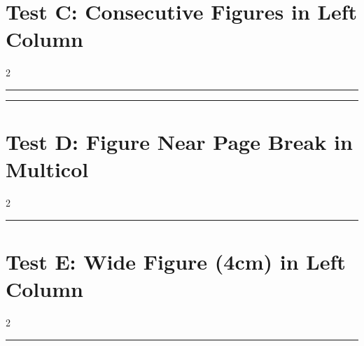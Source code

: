 \documentclass[a4paper,11pt]{article}
\begin{document}
\section*{Test C: Consecutive Figures in Left Column}
\begin{multicols}{2}
  \begin{swarmwrap}%
    \begin{minipage}[t]{2cm}
      \centering
      \rule{\linewidth}{1.5cm}
    \end{minipage}%
  \end{swarmwrap}%
  \swarmwrapnext
  \lipsum[1]
  \begin{swarmwrap}%
    \begin{minipage}[t]{2cm}
      \centering
      \rule{\linewidth}{1.5cm}
    \end{minipage}%
  \end{swarmwrap}%
  \swarmwrapnext
  \lipsum[2-3]
\end{multicols}

\section*{Test D: Figure Near Page Break in Multicol}
\begin{multicols}{2}
  \lipsum[1-8]%
  \begin{swarmwrap}%
    \begin{minipage}[t]{2cm}
      \centering
      \rule{\linewidth}{2.8cm}
    \end{minipage}%
  \end{swarmwrap}%
  \swarmwrapnext
  \lipsum[9-11]
\end{multicols}

\section*{Test E: Wide Figure (4cm) in Left Column}
\begin{multicols}{2}
  \begin{swarmwrap}%
    \begin{minipage}[t]{4cm}
      \centering
      \rule{\linewidth}{2.8cm}
    \end{minipage}%
  \end{swarmwrap}%
  \swarmwrapnext
  \lipsum[1-2]
\end{multicols}
\end{document}
